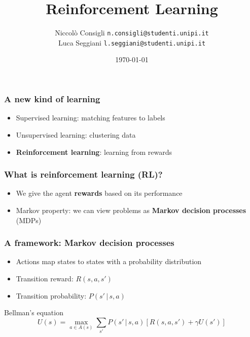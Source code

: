 \documentclass{beamer}
\title{Reinforcement Learning}
\author{
    Niccolò Consigli
		\scriptsize \texttt{n.consigli@studenti.unipi.it}
		\\
		\normalsize
    Luca Seggiani
		\scriptsize \texttt{l.seggiani@studenti.unipi.it}
		\normalsize
	}
\institute{Università di Pisa}
\date{\today}
\begin{document}
\begin{frame}
	\titlepage
\end{frame}

\begin{frame}
	\frametitle{A new kind of learning}
	\begin{itemize}
		\item<1-> Supervised learning: matching features to labels
		\item<2-> Unsupervised learning: clustering data
		\item<3-> \textbf{Reinforcement learning}: learning from rewards
	\end{itemize}
\end{frame}

\begin{frame}
	\frametitle{What is reinforcement learning (RL)?}
	\begin{itemize}
		\item<1-> We give the agent \textbf{rewards} based on its performance
		\item<2-> Markov property: we can view problems as \textbf{Markov decision processes} (MDPs)
	\end{itemize}
\end{frame}

\begin{frame}
	\frametitle{A framework: Markov decision processes}
	\begin{itemize}
		\item Actions map states to states with a probability distribution
		\item Transition reward: $R(s, a, s')$
		\item Transition probability: $P(s' \, | \, s, a)$
	\end{itemize}
	\begin{block}{Bellman's equation}
		$$
		U(s) = \max_{a \in A(s)} \sum_{s'} P(s' \, | \, s, a) \left[ R(s, a, s') + \gamma U(s') \right]
		$$
	\end{block}
\end{frame}
\end{document}
